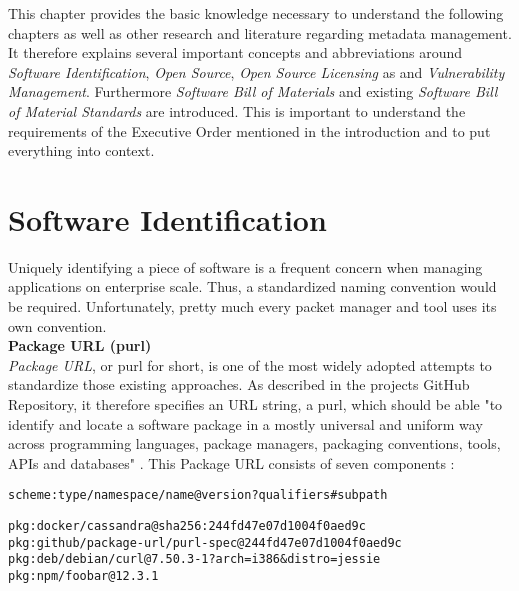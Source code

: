 
 \label{Foundations}
This chapter provides the basic knowledge necessary to understand the following chapters as well as other research and literature regarding metadata management. It therefore explains several important concepts and abbreviations around \textit{Software Identification}, \textit{Open Source}, \textit{Open Source Licensing} as and \textit{Vulnerability Management}. Furthermore \textit{Software Bill of Materials} and existing \textit{Software Bill of Material Standards} are introduced. This is important to understand the requirements of the Executive Order mentioned in the introduction and to put everything into context.

\section{Software Identification} \label{sec:Software Identification}
Uniquely identifying a piece of software is a frequent concern when managing applications on enterprise scale. Thus, a standardized naming convention would be required. Unfortunately, pretty much every packet manager and tool uses its own convention.\\

\noindent
\textbf{Package URL (purl)}\\
\noindent
\textit{Package URL}, or purl for short, is one of the most widely adopted attempts to standardize those existing approaches. As described in the projects GitHub Repository, it therefore specifies an URL string, a purl, which should be able "to identify and locate a software package in a mostly universal and uniform way across programming languages, package managers, packaging conventions, tools, APIs and databases" \cite{purl}. This Package URL consists of seven components \cite{purl}:\\

\begin{lstlisting}[caption=Package URL, captionpos=b, label=lst:Purl]
scheme:type/namespace/name@version?qualifiers#subpath
\end{lstlisting}

\begin{lstlisting}[caption=Package URL Examples, captionpos=b, label=lst:Purl]
pkg:docker/cassandra@sha256:244fd47e07d1004f0aed9c
pkg:github/package-url/purl-spec@244fd47e07d1004f0aed9c
pkg:deb/debian/curl@7.50.3-1?arch=i386&distro=jessie
pkg:npm/foobar@12.3.1
\end{lstlisting}

